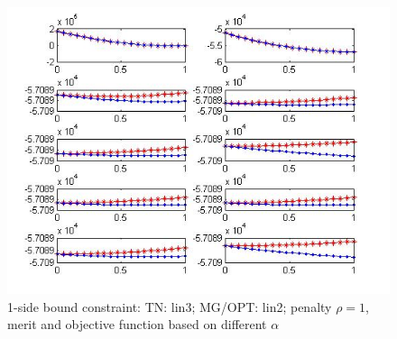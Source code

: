 \documentclass[10pt]{article}
\begin{document}
 
\begin{figure}
  \centering
  \includegraphics[width=1\textwidth]{merit1s32}
  \caption{1-side bound constraint: TN: lin3; MG/OPT: lin2;  penalty $\rho=1$, merit and objective function based on different $\alpha$}
  \label{fig:merit32}
\end{figure}
\end{document}
